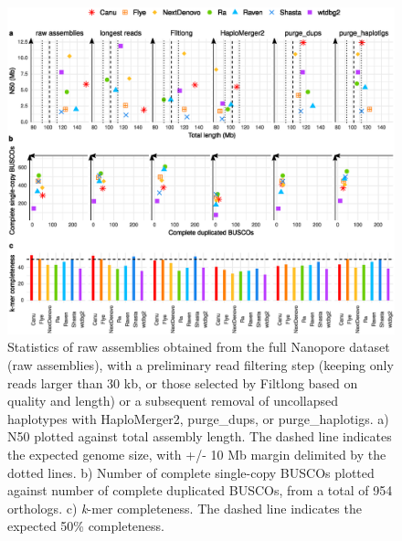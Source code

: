  
 \begin{figure}[ht]
    \centering
     \includegraphics[width=13.5cm]{fig/benchmark/nanopore_all_v20210317.eps}
   \caption{Statistics of raw assemblies obtained from the full Nanopore dataset (raw assemblies), with a preliminary read filtering step (keeping only reads larger than 30 kb, or those selected by Filtlong based on quality and length) or a subsequent removal of uncollapsed haplotypes with HaploMerger2, purge\_dups, or purge\_haplotigs. a) N50 plotted against total assembly length. The dashed line indicates the expected genome size, with +/- 10 Mb margin delimited by the dotted lines. b) Number of complete single-copy BUSCOs plotted against number of complete duplicated BUSCOs, from a total of 954 orthologs. c) \textit{k}-mer completeness. The dashed line indicates the expected 50\% completeness.}
   \label{fig:nanopore_full_stats}
 \end{figure}
 
